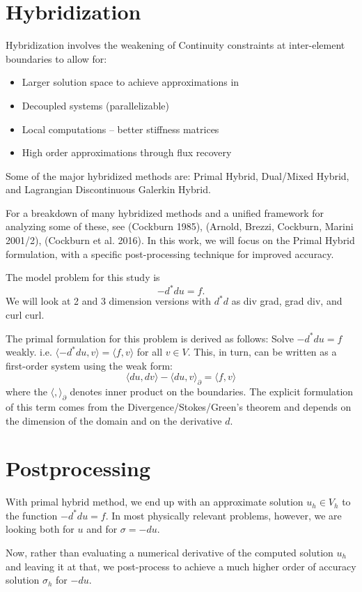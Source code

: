 \documentclass{article}
\begin{document}
\section{Hybridization}
Hybridization involves the weakening of Continuity 
constraints at inter-element boundaries to allow for: 
\begin{itemize}
\item Larger solution space to achieve approximations in
\item Decoupled systems (parallelizable)
\item Local computations -- better stiffness matrices
\item High order approximations through flux recovery
\end{itemize}
Some of the major hybridized methods are: 
Primal Hybrid, 
Dual/Mixed Hybrid, and 
Lagrangian Discontinuous Galerkin Hybrid. 

For a breakdown of many hybridized methods and a unified framework 
for analyzing some of these, see (Cockburn 1985), 
(Arnold, Brezzi, Cockburn, Marini 2001/2), (Cockburn et al. 2016). 
In this work, we will focus on the Primal Hybrid formulation, with a 
specific post-processing technique for improved accuracy. 

The model problem for this study is $$-d^*du=f.$$ We will look at 
2 and 3 dimension versions with $d^*d$ as div grad, grad div, and curl curl. 

The primal formulation for this problem is derived as follows: 
Solve $-d^*du=f$ weakly. i.e. $\langle-d^*du,v\rangle=\langle f,v\rangle$ 
for all $v\in V$. This, in turn, can be written as a first-order system 
using the weak form:
$$
\langle du,dv\rangle-\langle du, v\rangle_\partial=\langle f,v\rangle
$$
where the $\langle,\rangle_\partial$ denotes inner product on the 
boundaries. The explicit formulation of this term comes from the 
Divergence/Stokes/Green's theorem and depends
on the dimension of the domain and on the derivative $d$. 

\section{Postprocessing}
With primal hybrid method, we end up with an approximate 
solution $u_h\in V_h$ to the function $-d^*du=f$. 
In most physically relevant problems, however, we are looking both for $u$ and for 
$\sigma=-du$. 

Now, rather than evaluating a numerical derivative of the 
computed solution $u_h$ and leaving it at that, we post-process to achieve 
a much higher order of accuracy solution $\sigma_h$ for $-du$. 
\end{document}
